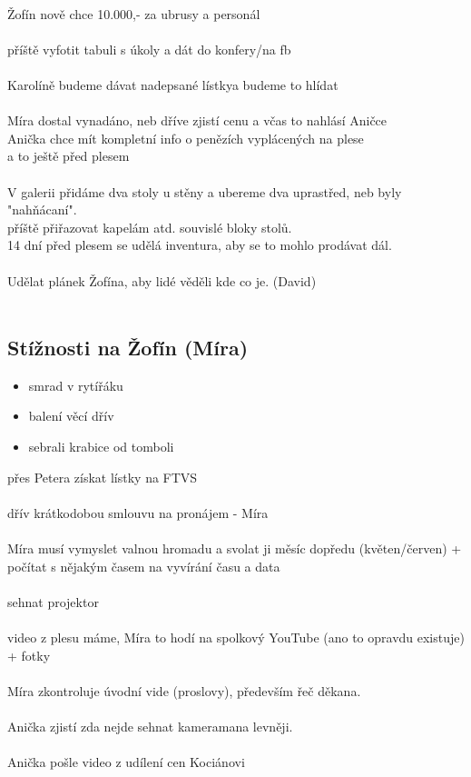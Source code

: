 \documentclass[10pt,a4paper]{article}
\begin{document}
\\
Žofín nově chce 10.000,- za ubrusy a personál\\
\\
příště vyfotit tabuli s úkoly a dát do konfery/na fb\\
\\
Karolíně budeme dávat nadepsané lístkya budeme to hlídat\\
\\
Míra dostal vynadáno, neb dříve zjistí cenu a včas to nahlásí Aničce\\
Anička chce mít kompletní info o penězích vyplácených na plese\\
a to ještě před plesem\\
\\
V galerii přidáme dva stoly u stěny a
ubereme dva uprastřed, neb byly "nahňácaní".\\
příště přiřazovat kapelám atd. souvislé bloky stolů.
\\
14 dní před plesem se udělá inventura, aby se to mohlo prodávat dál.\\
\\
Udělat plánek Žofína, aby lidé věděli kde co je. (David)\\
\\
\subsection*{Stížnosti na Žofín (Míra)} 
\begin{itemize}
\item smrad v rytířáku
\item balení věcí dřív
\item sebrali krabice od tomboli
\end{itemize}

přes Petera získat lístky na FTVS\\
\\
dřív krátkodobou smlouvu na pronájem - Míra\\
\\
Míra musí vymyslet valnou hromadu a svolat ji měsíc dopředu (květen/červen)  + počítat s nějakým časem na vyvírání času a data\\
 \\
 sehnat projektor\\
 \\
 video z plesu máme, Míra to hodí na
 spolkový YouTube (ano to opravdu existuje) + fotky\\
 \\
 Míra zkontroluje úvodní vide (proslovy), především řeč děkana.\\
 \\
 Anička zjistí zda nejde sehnat kameramana levněji.\\
 \\
 Anička pošle video z udílení cen Kociánovi\\
 
\end{document}
